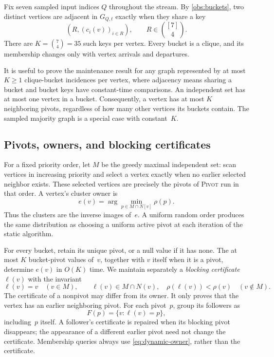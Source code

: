 \documentclass[11pt,letterpaper]{article}
\theoremstyle{definition}
\theoremstyle{remark}
\newcommand{\1}{\mathbf{1}}
\newcommand{\Pivot}{\textnormal{\textsc{Pivot}}}
\begin{document}
Fix seven sampled input indices $Q$ throughout the stream.  By \cref{obs:buckets}, two distinct vertices are adjacent in $G_{Q,t}$ exactly when they share a key
\[
 \left(R,(c_i(v))_{i\in R}\right),
 \qquad R\in\binom{[7]}4.
\]
There are $K=\binom74=35$ such keys per vertex.  Every bucket is a clique, and its membership changes only with vertex arrivals and departures.

It is useful to prove the maintenance result for any graph represented by at most $K\ge1$ clique-bucket incidences per vertex, where adjacency means sharing a bucket and bucket keys have constant-time comparisons.  An independent set has at most one vertex in a bucket.  Consequently, a vertex has at most $K$ neighboring pivots, regardless of how many other vertices its buckets contain.  The sampled majority graph is a special case with constant~$K$.

\subsection{Pivots, owners, and blocking certificates}

For a fixed priority order, let $M$ be the greedy maximal independent set: scan vertices in increasing priority and select a vertex exactly when no earlier selected neighbor exists.  These selected vertices are precisely the pivots of \Pivot{} run in that order.  A vertex's cluster owner is
\begin{equation}\label{eq:dynamic-owner}
 e(v)=\arg\min_{p\in M\cap N[v]}\rho(p).
\end{equation}
Thus the clusters are the inverse images of~$e$.  A uniform random order produces the same distribution as choosing a uniform active pivot at each iteration of the static algorithm.

For every bucket, retain its unique pivot, or a null value if it has none.  The at most $K$ bucket-pivot values of~$v$, together with $v$ itself when it is a pivot, determine $e(v)$ in $O(K)$ time.  We maintain separately a \emph{blocking certificate} $\ell(v)$ with the invariant
\begin{equation}\label{eq:certificate-invariant}
 \ell(v)=v\quad(v\in M),
 \qquad
 \ell(v)\in M\cap N(v),\quad
 \rho(\ell(v))<\rho(v)\quad(v\notin M).
\end{equation}
The certificate of a nonpivot may differ from its owner.  It only proves that the vertex has an earlier neighboring pivot.  For each pivot~$p$, group its followers as
\[
 F(p)=\{v:\ell(v)=p\},
\]
including~$p$ itself.  A follower's certificate is repaired when its blocking pivot disappears; the appearance of a different earlier pivot need not change the certificate.  Membership queries always use \cref{eq:dynamic-owner}, rather than the certificate.
\end{document}
